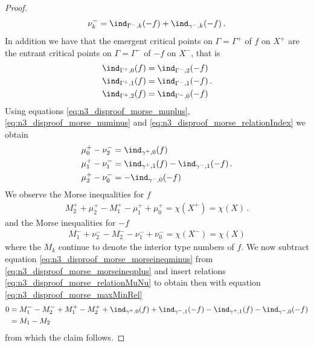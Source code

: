 \begin{proof}
  \begin{align}
    \nu^-_k=\ind_{\Gamma^-,k}(-f)+\ind_{\gamma^-,k}(-f)\,.\label{eq:n3_disproof_morse_numinus}
  \end{align}
  In addition we have that the emergent critical points on $\Gamma=\Gamma^+$ of $f$ on $X^+$ are the
  entrant critical points on $\Gamma=\Gamma^-$ of $-f$ on $X^-$, that is
  \begin{equation}
    \begin{aligned}
      \ind_{\Gamma^+,0}(f)&=\ind_{\Gamma^-,2}(-f) \\
      \ind_{\Gamma^+,1}(f)&=\ind_{\Gamma^-,1}(-f) \\
      \ind_{\Gamma^+,2}(f)&=\ind_{\Gamma^-,0}(-f)\label{eq:n3_disproof_morse_relationIndex} 
    \end{aligned}\,.
  \end{equation}
  Using equations \eqref{eq:n3_disproof_morse_muplus}, \eqref{eq:n3_disproof_morse_numinus} and \eqref{eq:n3_disproof_morse_relationIndex}
  we obtain
  \begin{equation}
    \begin{aligned}
      \mu^+_0-\nu^-_2&=\ind_{\gamma^+,0}(f) \\
      \mu^+_1-\nu^-_1&=\ind_{\gamma^+,1}(f)-\ind_{\gamma^-,1}(-f) \\
      \mu^+_2-\nu^-_0&=-\ind_{\gamma^-,0}(-f)
    \end{aligned}\,.\label{eq:n3_disproof_morse_relationMuNu}
  \end{equation}
  We observe the Morse inequalities for $f$
  \begin{align}
    M_2^++\mu^+_2-M_1^+-\mu^+_1+\mu^+_0=\chi(X^+)=\chi(X)\,.\label{eq:n3_disproof_morse_morseineqplus}
  \end{align}
  and the Morse inequalities for $-f$
  \begin{align}
    M_1^-+\nu^-_2-M_2^--\nu^-_1+\nu^-_0=\chi(X^-)=\chi(X)\label{eq:n3_disproof_morse_morseineqminus}
  \end{align}
  where the $M_k$ continue to denote the interior type numbers of $f$.
  We now subtract equation \eqref{eq:n3_disproof_morse_morseineqminus} from \eqref{eq:n3_disproof_morse_morseineqplus}
  and insert relations \eqref{eq:n3_disproof_morse_relationMuNu} to obtain
  then with equation \eqref{eq:n3_disproof_morse_maxMinRel}
  \begin{align*}
    0&=M_1^--M_2^-+M_1^+-M_2^++\ind_{\gamma^+,0}(f)+\ind_{\gamma^-,1}(-f)-\ind_{\gamma^+,1}(f)-\ind_{\gamma^-,0}(-f) \\
    &= M_1-M_2
  \end{align*}
  from which the claim follows.



\end{proof}
